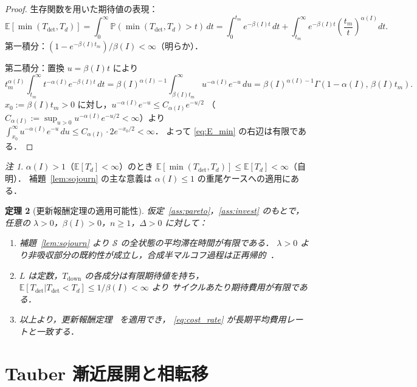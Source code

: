 \documentclass[12pt,a4paper]{article}
\theoremstyle{plain}
\newtheorem{theorem}{定理}[section]
\theoremstyle{definition}
\theoremstyle{remark}
\newtheorem{remark}[theorem]{注}
\newcommand{\E}{\mathbb{E}}
\newcommand{\Prob}{\mathbb{P}}
\newcommand{\Tdet}{T_{\mathrm{det}}}
\newcommand{\Tdown}{T_{\mathrm{down}}}
\newcommand{\betaI}{\beta(I)}
\newcommand{\alphI}{\alpha(I)}
\begin{document}
\begin{proof}
生存関数を用いた期待値の表現：
\[
\E[\min(\Tdet,T_d)]=\int_0^\infty\Prob(\min(\Tdet,T_d)>t)\,dt
=\int_0^{t_m}e^{-\betaI t}\,dt
+\int_{t_m}^\infty e^{-\betaI t}\!\left(\frac{t_m}{t}\right)^{\!\alphI}\!\!dt.
\]
第一積分：$(1-e^{-\betaI t_m})/\betaI<\infty$（明らか）．

第二積分：置換 $u=\betaI t$ により
\[
t_m^{\alphI}\int_{t_m}^\infty t^{-\alphI}e^{-\betaI t}\,dt
=\betaI^{\alphI-1}\int_{\betaI t_m}^\infty u^{-\alphI}e^{-u}\,du
=\betaI^{\alphI-1}\Gamma(1-\alphI,\,\betaI t_m).
\]
$x_0:=\betaI t_m>0$ に対し，$u^{-\alphI}e^{-u}\le C_{\alphI}e^{-u/2}$
（$C_{\alphI}:=\sup_{u>0}u^{-\alphI}e^{-u/2}<\infty$）より
$\int_{x_0}^\infty u^{-\alphI}e^{-u}\,du\le C_{\alphI}\cdot2e^{-x_0/2}<\infty$．
よって \eqref{eq:E_min} の右辺は有限である．
\end{proof}

\begin{remark}
$\alphI>1$（$\E[T_d]<\infty$）のとき $\E[\min(\Tdet,T_d)]\le\E[T_d]<\infty$（自明）．
補題~\ref{lem:sojourn} の主な意義は $\alphI\le1$ の重尾ケースへの適用にある．
\end{remark}

\begin{theorem}[更新報酬定理の適用可能性]\label{thm:renewal}
仮定~\ref{ass:pareto}，\ref{ass:invest} のもとで，任意の $\lambda>0$，$\betaI>0$，$n\ge1$，$\Delta>0$ に対して：
\begin{enumerate}[label=(\roman*)]
\item 補題~\ref{lem:sojourn} より $\mathcal{S}$ の全状態の平均滞在時間が有限である．
  $\lambda>0$ より非吸収部分の既約性が成立し，合成半マルコフ過程は正再帰的~\cite{limnios2001}．
\item $L$ は定数，$\Tdown$ の各成分は有限期待値を持ち，
  $\E[\Tdet|\Tdet<T_d]\le1/\betaI<\infty$ より
  サイクルあたり期待費用が有限である．
\item 以上より，更新報酬定理~\cite{ross2014} を適用でき，
  \eqref{eq:cost_rate} が長期平均費用レートと一致する．
\end{enumerate}
\end{theorem}

\section{Tauber 漸近展開と相転移}
\label{sec:tauberian}
\end{document}
